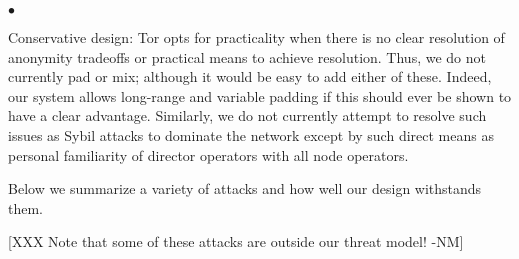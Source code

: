 \documentclass[times,10pt,twocolumn]{article}
\newenvironment{tightlist}{\begin{list}{$\bullet$}{
  \setlength{\itemsep}{0mm}
    \setlength{\parsep}{0mm}
    }}{\end{list}}
\begin{document}
\begin{tightlist}
\item[Conservative design:] Tor opts for practicality when there is no
  clear resolution of anonymity tradeoffs or practical means to
  achieve resolution. Thus, we do not currently pad or mix; although
  it would be easy to add either of these. Indeed, our system allows
  long-range and variable padding if this should ever be shown to have
  a clear advantage.  Similarly, we do not currently attempt to
  resolve such issues as Sybil attacks to dominate the network except
  by such direct means as personal familiarity of director operators
  with all node operators.
\end{tightlist}

\label{sec:attacks}

Below we summarize a variety of attacks and how well our design withstands
them.

[XXX Note that some of these attacks are outside our threat model! -NM]
\end{document}
